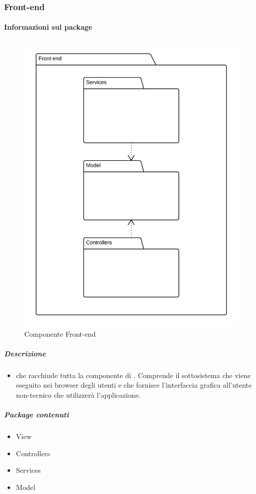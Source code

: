 
	\subsubsection{Front-end}
	\paragraph{Informazioni sul package} 
		\begin{figure}[H] 
			\begin{center} 
				\includegraphics[width=\textwidth]{uml/package/Front-end.png}  
				\caption{Componente Front-end}
			\end{center}  
		\end{figure} 
	\subparagraph{Descrizione} 
		\begin{itemize}
		\item[]  che racchiude tutta la componente di . Comprende il sottosistema che viene eseguito nei browser degli utenti e che fornisce l'interfaccia grafica all'utente non-tecnico che utilizzerà l'applicazione.
		\end{itemize} 
		\subparagraph{Package contenuti} 
		\begin{itemize}
				\item View
				\item Controllers
				\item Services
				\item Model
		\end{itemize}
